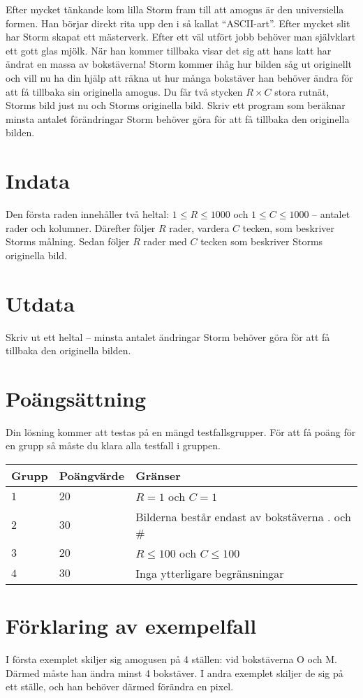 Efter mycket tänkande kom lilla Storm fram till att amogus är den universiella formen. Han börjar direkt rita upp den
i så kallat ``ASCII-art''. Efter mycket slit har Storm skapat ett mästerverk. Efter ett väl utfört jobb behöver man
självklart ett gott glas mjölk. När han kommer tillbaka visar det sig att hans katt har ändrat en massa av bokstäverna!
Storm kommer ihåg hur bilden såg ut originellt och vill nu ha din hjälp att räkna ut hur många bokstäver han behöver ändra
för att få tillbaka sin originella amogus.
Du får två stycken $R\times C$ stora rutnät, Storms bild just nu och Storms originella bild. Skriv ett program som beräknar
minsta antalet förändringar Storm behöver göra för att få tillbaka den originella bilden.

\section*{Indata}
Den första raden innehåller två heltal: $1\leq R \leq 1000$ och $1 \leq C \leq 1000$ -- antalet rader och kolumner.
Därefter följer $R$ rader, vardera $C$ tecken, som beskriver Storms målning. 
Sedan följer $R$ rader med $C$ tecken som beskriver Storms originella bild. 

\section*{Utdata}
Skriv ut ett heltal -- minsta antalet ändringar Storm behöver göra för att få tillbaka den originella bilden.

\section*{Poängsättning}
Din lösning kommer att testas på en mängd testfallsgrupper.
För att få poäng för en grupp så måste du klara alla testfall i gruppen.

\noindent
\begin{tabular}{| l | l | p{12cm} |}
  \hline
  Grupp & Poängvärde & Gränser \\ \hline
  $1$   & $20$       & $R=1$ och $C=1$ \\ \hline
  $2$   & $30$       & Bilderna består endast av bokstäverna . och \#\\ \hline
  $3$   & $20$       & $R \leq 100$ och $C \leq 100$  \\ \hline
  $4$   & $30$       & Inga ytterligare begränsningar  \\ \hline
\end{tabular}

\section*{Förklaring av exempelfall}
I första exemplet skiljer sig amogusen på 4 ställen: vid bokstäverna O och M. Därmed måste han ändra minst 4 bokstäver.
I andra exemplet skiljer de sig på ett ställe, och han behöver därmed förändra en pixel.

